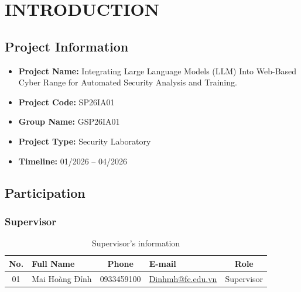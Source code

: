 \chapter{INTRODUCTION}

\section{Project Information}
\begin{itemize}
	\item \textbf{Project Name:} Integrating Large Language Models (LLM) Into Web-Based Cyber Range for Automated Security Analysis and Training.
	\item \textbf{Project Code:} SP26IA01
	\item \textbf{Group Name:} GSP26IA01
	\item \textbf{Project Type:} Security Laboratory
	\item \textbf{Timeline:} 01/2026 -- 04/2026
\end{itemize}

\section{Participation}

\subsection{Supervisor}
\renewcommand{\arraystretch}{1.3}
\begin{table}[H]
	\centering
	\begin{tabularx}{\textwidth}{|c|l|c|>{\raggedright\arraybackslash}X|c|}
		\hline
		\textbf{No.} & \textbf{Full Name} & \textbf{Phone} & \textbf{E-mail} & \textbf{Role} \\
		\hline
		01 & Mai Hoàng Đỉnh & 0933459100 & \url{Dinhmh@fe.edu.vn} & Supervisor \\
		\hline
	\end{tabularx}
	\caption{Supervisor's information}
\end{table}

